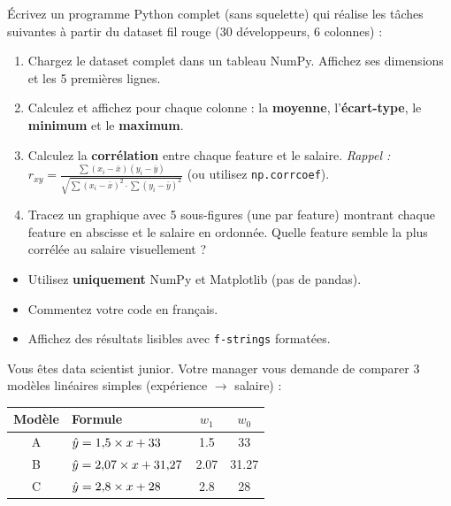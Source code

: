 \'{E}crivez un programme Python complet (sans squelette) qui r\'{e}alise les t\^{a}ches suivantes
\`{a} partir du dataset fil rouge (30 d\'{e}veloppeurs, 6 colonnes) :

\begin{enumerate}[label=\alph*)]
    \item Chargez le dataset complet dans un tableau NumPy.
        Affichez ses dimensions et les 5 premi\`{e}res lignes.

    \item Calculez et affichez pour chaque colonne :
        la \textbf{moyenne}, l'\textbf{\'{e}cart-type}, le \textbf{minimum} et le \textbf{maximum}.

    \item Calculez la \textbf{corr\'{e}lation} entre chaque feature et le salaire.
        \emph{Rappel :} $r_{xy} = \frac{\sum (x_i - \bar{x})(y_i - \bar{y})}
        {\sqrt{\sum (x_i - \bar{x})^2 \cdot \sum (y_i - \bar{y})^2}}$
        \quad (ou utilisez \texttt{np.corrcoef}).

    \item Tracez un graphique avec 5 sous-figures (une par feature) montrant
        chaque feature en abscisse et le salaire en ordonn\'{e}e.
        Quelle feature semble la plus corr\'{e}l\'{e}e au salaire visuellement ?
\end{enumerate}

\begin{attentionbox}[Consignes]
    \begin{itemize}
        \item Utilisez \textbf{uniquement} NumPy et Matplotlib (pas de pandas).
        \item Commentez votre code en fran\c{c}ais.
        \item Affichez des r\'{e}sultats lisibles avec \texttt{f-strings} format\'{e}es.
    \end{itemize}
\end{attentionbox}


Vous \^{e}tes data scientist junior. Votre manager vous demande de comparer
3 mod\`{e}les lin\'{e}aires simples (exp\'{e}rience $\to$ salaire) :

\begin{center}
\renewcommand{\arraystretch}{1.2}
\begin{tabular}{c l c c}
    \toprule
    \textbf{Mod\`{e}le} & \textbf{Formule} & $w_1$ & $w_0$ \\
    \midrule
    A & $\hat{y} = 1{,}5 \times x + 33$ & 1.5 & 33 \\
    B & $\hat{y} = 2{,}07 \times x + 31{,}27$ & 2.07 & 31.27 \\
    C & $\hat{y} = 2{,}8 \times x + 28$ & 2.8 & 28 \\
    \bottomrule
\end{tabular}
\end{center}

